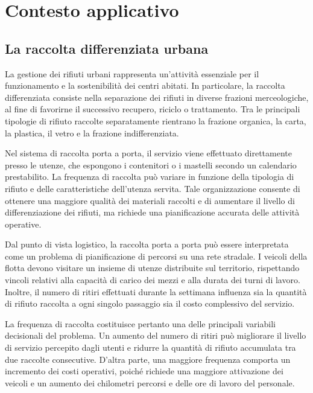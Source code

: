 \section{Contesto applicativo}


\subsection{La raccolta differenziata urbana}

La gestione dei rifiuti urbani rappresenta un'attività essenziale per il funzionamento e la sostenibilità dei centri abitati. In particolare, la raccolta differenziata consiste nella separazione dei rifiuti in diverse frazioni merceologiche, al fine di favorirne il successivo recupero, riciclo o trattamento. Tra le principali tipologie di rifiuto raccolte separatamente rientrano la frazione organica, la carta, la plastica, il vetro e la frazione indifferenziata.

Nel sistema di raccolta porta a porta, il servizio viene effettuato direttamente presso le utenze, che espongono i contenitori o i mastelli secondo un calendario prestabilito. La frequenza di raccolta può variare in funzione della tipologia di rifiuto e delle caratteristiche dell'utenza servita. Tale organizzazione consente di ottenere una maggiore qualità dei materiali raccolti e di aumentare il livello di differenziazione dei rifiuti, ma richiede una pianificazione accurata delle attività operative.

Dal punto di vista logistico, la raccolta porta a porta può essere interpretata come un problema di pianificazione di percorsi su una rete stradale. I veicoli della flotta devono visitare un insieme di utenze distribuite sul territorio, rispettando vincoli relativi alla capacità di carico dei mezzi e alla durata dei turni di lavoro. Inoltre, il numero di ritiri effettuati durante la settimana influenza sia la quantità di rifiuto raccolta a ogni singolo passaggio sia il costo complessivo del servizio.

La frequenza di raccolta costituisce pertanto una delle principali variabili decisionali del problema. Un aumento del numero di ritiri può migliorare il livello di servizio percepito dagli utenti e ridurre la quantità di rifiuto accumulata tra due raccolte consecutive. D'altra parte, una maggiore frequenza comporta un incremento dei costi operativi, poiché richiede una maggiore attivazione dei veicoli e un aumento dei chilometri percorsi e delle ore di lavoro del personale.


